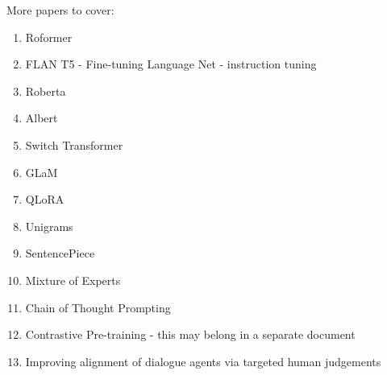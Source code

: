 \documentclass[11pt]{article}
\theoremstyle{definition}
\begin{document}
More papers to cover:

\begin{enumerate}
\item Roformer
\item FLAN T5 - Fine-tuning Language Net - instruction tuning
\item Roberta
\item Albert
\item Switch Transformer
\item GLaM
\item QLoRA
\item Unigrams
\item SentencePiece
\item Mixture of Experts
\item Chain of Thought Prompting
\item Contrastive Pre-training - this may belong in a separate document
\item Improving alignment of dialogue agents via targeted human judgements
\end{enumerate}


\end{document}
